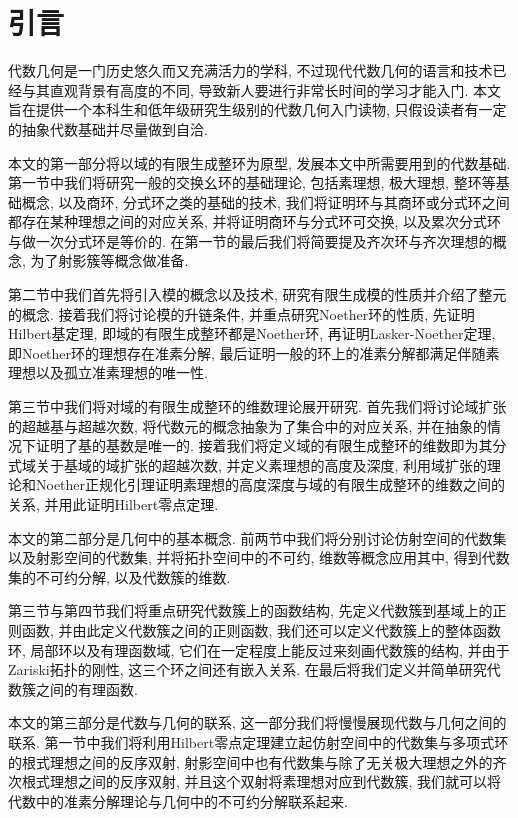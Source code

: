 
\section{引言}

代数几何是一门历史悠久而又充满活力的学科, 不过现代代数几何的语言和技术已经与其直观背景有高度的不同, 导致新人要进行非常长时间的学习才能入门. 本文旨在提供一个本科生和低年级研究生级别的代数几何入门读物, 只假设读者有一定的抽象代数基础并尽量做到自洽.

本文的第一部分将以域的有限生成整环为原型, 发展本文中所需要用到的代数基础. 第一节中我们将研究一般的交换幺环的基础理论, 包括素理想, 极大理想, 整环等基础概念, 以及商环, 分式环之类的基础的技术, 我们将证明环与其商环或分式环之间都存在某种理想之间的对应关系, 并将证明商环与分式环可交换, 以及累次分式环与做一次分式环是等价的. 在第一节的最后我们将简要提及齐次环与齐次理想的概念, 为了射影簇等概念做准备.

第二节中我们首先将引入模的概念以及技术, 研究有限生成模的性质并介绍了整元的概念. 接着我们将讨论模的升链条件, 并重点研究Noether环的性质, 先证明Hilbert基定理, 即域的有限生成整环都是Noether环, 再证明Lasker-Noether定理, 即Noether环的理想存在准素分解, 最后证明一般的环上的准素分解都满足伴随素理想以及孤立准素理想的唯一性.

第三节中我们将对域的有限生成整环的维数理论展开研究. 首先我们将讨论域扩张的超越基与超越次数, 将代数元的概念抽象为了集合中的对应关系, 并在抽象的情况下证明了基的基数是唯一的. 接着我们将定义域的有限生成整环的维数即为其分式域关于基域的域扩张的超越次数, 并定义素理想的高度及深度, 利用域扩张的理论和Noether正规化引理证明素理想的高度深度与域的有限生成整环的维数之间的关系, 并用此证明Hilbert零点定理.

\bigskip

本文的第二部分是几何中的基本概念. 前两节中我们将分别讨论仿射空间的代数集以及射影空间的代数集, 并将拓扑空间中的不可约, 维数等概念应用其中, 得到代数集的不可约分解, 以及代数簇的维数.

第三节与第四节我们将重点研究代数簇上的函数结构, 先定义代数簇到基域上的正则函数, 并由此定义代数簇之间的正则函数, 我们还可以定义代数簇上的整体函数环, 局部环以及有理函数域, 它们在一定程度上能反过来刻画代数簇的结构, 并由于Zariski拓扑的刚性, 这三个环之间还有嵌入关系. 在最后将我们定义并简单研究代数簇之间的有理函数.

\bigskip

本文的第三部分是代数与几何的联系, 这一部分我们将慢慢展现代数与几何之间的联系. 第一节中我们将利用Hilbert零点定理建立起仿射空间中的代数集与多项式环的根式理想之间的反序双射, 射影空间中也有代数集与除了无关极大理想之外的齐次根式理想之间的反序双射, 并且这个双射将素理想对应到代数簇, 我们就可以将代数中的准素分解理论与几何中的不可约分解联系起来.

